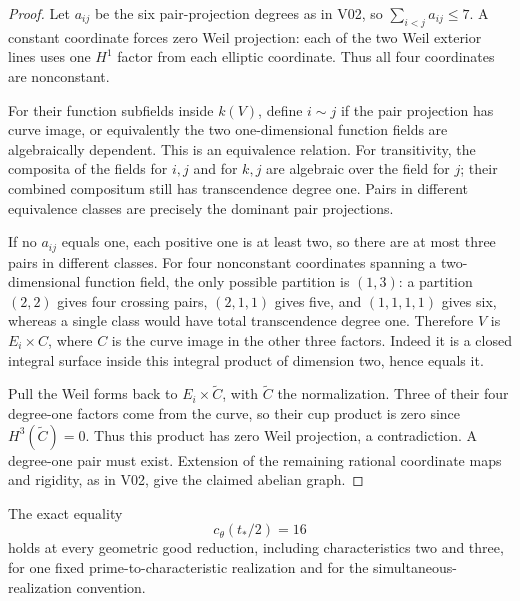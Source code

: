 \begin{proof}
Let $a_{ij}$ be the six pair-projection degrees as in V02, so
$\sum_{i<j}a_{ij}\leq7$. A constant coordinate forces zero Weil
projection: each of the two Weil exterior lines uses one $H^1$ factor
from each elliptic coordinate. Thus all four coordinates are nonconstant.

For their function subfields inside $k(V)$, define $i\sim j$ if the
pair projection has curve image, or equivalently the two one-dimensional
function fields are algebraically dependent. This is an equivalence
relation. For transitivity, the composita of the fields for $i,j$ and
for $k,j$ are algebraic over the field for $j$; their combined
compositum still has transcendence degree one. Pairs in different
equivalence classes are precisely the
dominant pair projections.

If no $a_{ij}$ equals one, each positive one is at least two, so there
are at most three pairs in different classes. For four nonconstant
coordinates spanning a two-dimensional function field, the only
possible partition is $(1,3)$: a partition $(2,2)$ gives four crossing
pairs, $(2,1,1)$ gives five, and $(1,1,1,1)$ gives six, whereas a single
class would have total transcendence degree one. Therefore $V$ is
$E_i\times C$, where $C$ is the curve image in the other three factors.
Indeed it is a closed integral surface inside this integral product of
dimension two, hence equals it.

Pull the Weil forms back to $E_i\times\widetilde C$, with
$\widetilde C$ the normalization. Three of their four degree-one
factors come from the curve, so their cup product is zero since
$H^3(\widetilde C)=0$. Thus this product has zero Weil projection, a
contradiction. A degree-one pair must exist. Extension of the remaining
rational coordinate maps and rigidity, as in V02, give the claimed
abelian graph.
\end{proof}

\begin{theorem}
The exact equality
\[
                    c_\theta(t_*/2)=16
\]
holds at every geometric good reduction, including characteristics two
and three, for one fixed prime-to-characteristic realization and for
the simultaneous-realization convention.
\end{theorem}

